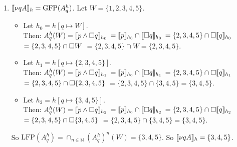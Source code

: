 \documentclass[a4paper, draft, 12pt]{article}
\begin{document}
\begin{enumerate}
\begin{enumerate}
\begin{enumerate}
  \item 
  $\llbracket\nu q A\rrbracket_h = \text{GFP}(A^h_q)$. Let $W = \{1,2,3,4,5\}$.
  \begin{itemize}
  \item 
  Let $h_0 = h[q \mapsto W]$. \\
  Then:
  $A^h_q(W) = \llbracket p \wedge \square q\rrbracket_{h_0}$ 
  $ = \llbracket p\rrbracket_{h_0} \cap \llbracket\square q\rrbracket_{h_0}$
  $ = \{2,3,4,5\} \cap \square \llbracket q\rrbracket_{h_0}$
  $ = \{2,3,4,5\} \cap \square W$
  $ = \{2,3,4,5\} \cap W = \{2,3,4,5\}$.
  \item 
  Let $h_1 = h[q \mapsto \{2,3,4,5\}]$. \\
  Then:
  $A^h_q(W) = \llbracket p \wedge \square q\rrbracket_{h_1}$ 
  $ = \llbracket p\rrbracket_{h_0} \cap \llbracket\square q\rrbracket_{h_1}$
  $ = \{2,3,4,5\} \cap \square \llbracket q\rrbracket_{h_1}$
  $ = \{2,3,4,5\} \cap \square \{2,3,4,5\}$
  $ = \{2,3,4,5\} \cap \{3,4,5\} = \{3,4,5\}$.
  \item 
  Let $h_2 = h[q \mapsto \{3,4,5\}]$. \\
  Then:
  $A^h_q(W) = \llbracket p \wedge \square q\rrbracket_{h_2}$ 
  $ = \llbracket p\rrbracket_{h_0} \cap \llbracket\square q\rrbracket_{h_2}$
  $ = \{2,3,4,5\} \cap \square \llbracket q\rrbracket_{h_2}$
  $ = \{2,3,4,5\} \cap \square \{3,4,5\}$
  $ = \{2,3,4,5\} \cap \{3,4,5\} = \{3,4,5\}$.

  \end{itemize}
  So $\text{LFP}(A^h_q) = \cap_{n \in \mathbb{N}} (A^h_q)^n(W) = \{3,4,5\}$.
  So $\llbracket\nu q A\rrbracket_h = \{3,4,5\}$.

  \end{enumerate}
 
  

  \end{enumerate}



\end{enumerate}
\end{document}
